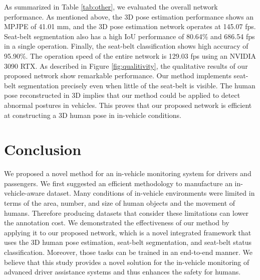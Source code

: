 \documentclass[letterpaper]{article} %
\begin{document}
As summarized in Table \ref{tab:other}, we evaluated the overall network performance. As mentioned above, the 3D pose estimation performance shows an MPJPE of 41.01 mm, and the 3D pose estimation network operates at 145.07 fps. Seat-belt segmentation also has a high IoU performance of 80.64\% and 686.54 fps in a single operation. Finally, the seat-belt classification shows high accuracy of 95.90\%. The operation speed of the entire network is 129.03 fps using an NVIDIA 3090 RTX. As described in Figure \ref{fig:qualitivity}, the qualitative results of our proposed network show remarkable performance. Our method implements seat-belt segmentation precisely even when little of the seat-belt is visible. The human pose reconstructed in 3D implies that our method could be applied to detect abnormal postures in vehicles. This proves that our proposed network is efficient at constructing a 3D human pose in in-vehicle conditions.

\section{Conclusion}
We proposed a novel method for an in-vehicle monitoring system for drivers and passengers. We first suggested an efficient methodology to manufacture an in-vehicle-aware dataset. Many conditions of in-vehicle environments were limited in terms of the area, number, and size of human objects and the movement of humans. Therefore producing datasets that consider these limitations can lower the annotation cost. We demonstrated the effectiveness of our method by applying it to our proposed network, which is a novel integrated framework that uses the 3D human pose estimation, seat-belt segmentation, and seat-belt status classification. Moreover, those tasks can be trained in an end-to-end manner.
We believe that this study provides a novel solution for the in-vehicle monitoring of advanced driver assistance systems and thus enhances the safety for humans.

\end{document}
